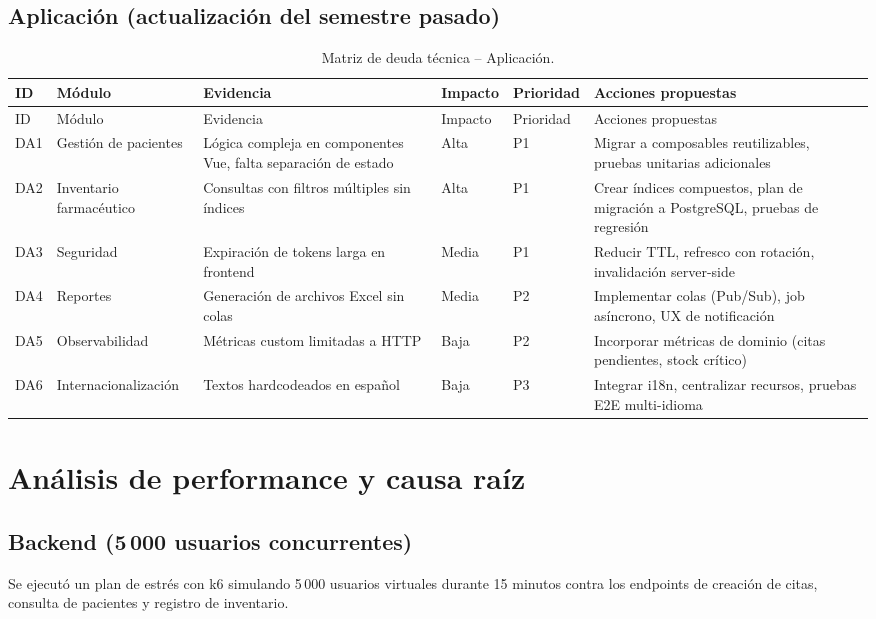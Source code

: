 \documentclass[12pt,letterpaper]{article}
\begin{document}
\subsection{Aplicación (actualización del semestre pasado)}
\begin{longtable}{p{1cm} p{3.4cm} p{4.8cm} p{3.2cm} p{2.9cm} p{4cm}}
  \caption{Matriz de deuda técnica -- Aplicación.}\label{tab:deuda-aplicacion}\\
  \toprule
  ID & Módulo & Evidencia & Impacto & Prioridad & Acciones propuestas \\
  \midrule
  \endfirsthead
  \toprule
  ID & Módulo & Evidencia & Impacto & Prioridad & Acciones propuestas \\
  \midrule
  \endhead
  DA1 & Gestión de pacientes & Lógica compleja en componentes Vue, falta separación de estado & Alta & P1 & Migrar a composables reutilizables, pruebas unitarias adicionales \\
  DA2 & Inventario farmacéutico & Consultas con filtros múltiples sin índices & Alta & P1 & Crear índices compuestos, plan de migración a PostgreSQL, pruebas de regresión \\
  DA3 & Seguridad & Expiración de tokens larga en frontend & Media & P1 & Reducir TTL, refresco con rotación, invalidación server-side \\
  DA4 & Reportes & Generación de archivos Excel sin colas & Media & P2 & Implementar colas (Pub/Sub), job asíncrono, UX de notificación \\
  DA5 & Observabilidad & Métricas custom limitadas a HTTP & Baja & P2 & Incorporar métricas de dominio (citas pendientes, stock crítico) \\
  DA6 & Internacionalización & Textos hardcodeados en español & Baja & P3 & Integrar i18n, centralizar recursos, pruebas E2E multi-idioma \\
  \bottomrule
\end{longtable}

\section{Análisis de performance y causa raíz}
\subsection{Backend (5\,000 usuarios concurrentes)}
Se ejecutó un plan de estrés con k6 simulando 5\,000 usuarios virtuales durante 15 minutos contra los endpoints de creación de citas, consulta de pacientes y registro de inventario.
\end{document}
